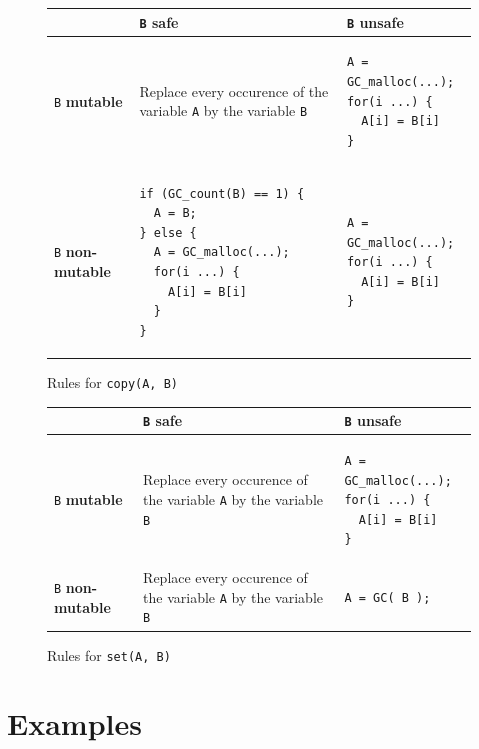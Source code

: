 \documentclass[12pt,a4paper,titlepage]{article}
\newcommand{\cl}[1]{\texttt{#1}}
\newcommand{\mut}{\textbf{mutable}}
\newcommand{\nmut}{\textbf{non-mutable}}
\begin{document}
\begin{figure}[h!]
\begin{tabular}{|p{5.5cm}|p{5.5cm}|p{6cm}|}
\hline
             & \cl{B} safe & \cl{B} unsafe \\ \hline
\cl{B} \mut  & Replace every occurence of the variable \cl{A} by the variable \cl{B} & \begin{lstlisting}
A = GC_malloc(...);
for(i ...) {
  A[i] = B[i]
}
\end{lstlisting} \\ \hline
\cl{B} \nmut & \begin{lstlisting}
if (GC_count(B) == 1) {
  A = B;
} else {
  A = GC_malloc(...);
  for(i ...) {
    A[i] = B[i]
  }
}
\end{lstlisting} & \begin{lstlisting}
A = GC_malloc(...);
for(i ...) {
  A[i] = B[i]
}
\end{lstlisting} \\ \hline
\end{tabular}
\caption{Rules for \cl{copy(A, B)}}
\end{figure}

\begin{figure}[h!]
\begin{tabular}{|p{5.5cm}|p{5.5cm}|p{6cm}|}
\hline
             & \cl{B} safe & \cl{B} unsafe \\ \hline
\cl{B} \mut  & Replace every occurence of the variable \cl{A} by the variable \cl{B} & \begin{lstlisting}
A = GC_malloc(...);
for(i ...) {
  A[i] = B[i]
}
\end{lstlisting} \\ \hline
\cl{B} \nmut & Replace every occurence of the variable \cl{A} by the variable \cl{B} & \begin{lstlisting}
A = GC( B );
\end{lstlisting} \\ \hline
\end{tabular}
\caption{Rules for \cl{set(A, B)}}
\end{figure}



\newpage
\section{Examples}
\end{document}
